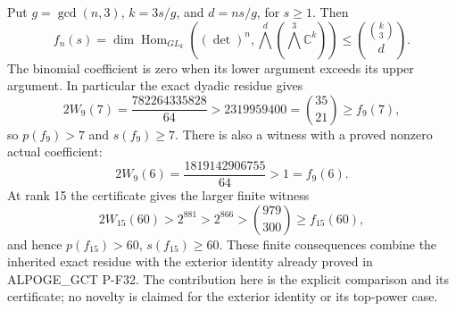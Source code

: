 \begin{proposition}
Put $g=\gcd(n,3)$, $k=3s/g$, and $d=ns/g$, for $s\ge1$.
Then
\[
 f_n(s)=\dim\operatorname{Hom}_{GL_k}
       ((\det)^n,\bigwedge^d(\bigwedge^3\mathbb C^k))
       \le \binom{\binom{k}{3}}{d}.
 \tag{PNEW-ext}
\]
The binomial coefficient is zero when its lower argument exceeds
its upper argument.  In particular the exact dyadic residue gives
\[
 2W_9(7)=\frac{782264335828}{64}
       >2319959400=\binom{35}{21}\ge f_9(7),
 \tag{PNEW-nine}
\]
so $p(f_9)>7$ and $s(f_9)\ge7$.
There is also a witness with a proved nonzero actual coefficient:
\[
 2W_9(6)=\frac{1819142906755}{64}>1=f_9(6).
 \tag{PNEW-nine-positive}
\]
At rank 15 the certificate gives the larger finite witness
\[
 2W_{15}(60)>2^{881}>2^{866}>\binom{979}{300}\ge f_{15}(60),
 \tag{PNEW-fifteen-sixty}
\]
and hence $p(f_{15})>60$, $s(f_{15})\ge60$.
These finite consequences combine the inherited exact residue with
the exterior identity already proved in ALPOGE\_GCT P-F32.
The contribution here is the explicit comparison and its certificate;
no novelty is claimed for the exterior identity or its top-power case.
\end{proposition}
